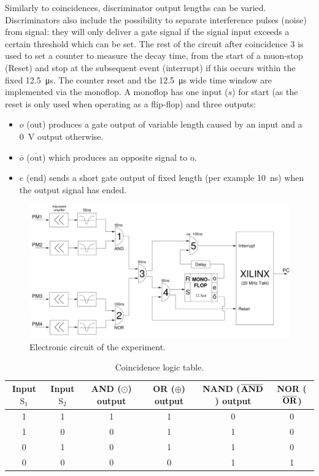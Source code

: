 Similarly to coincidences, discriminator output lengths can be varied. Discriminators also include the possibility to separate interference pulses (noise) from signal: they will only deliver a gate signal if the signal input exceeds a certain threshold which can be set. The rest of the circuit after coincidence 3 is used to set a counter to measure the decay time, from the start of a muon-stop (Reset) and stop at the subsequent event (interrupt) if this occurs within the fixed \SI{12.5}{\micro\second}. The counter reset and the \SI{12.5}{\micro\second} wide time window are implemented via the monoflop. A monoflop has one input ($s$) for start (as the reset is only used when operating as a flip-flop) and three outputs:

\begin{itemize}
\item $o$ (out) produces a gate output of variable length caused by an input and a \SI{0}{\volt} output otherwise.
\item $\overline{o}$ ($\overline{\text{out}}$) which produces an opposite signal to o.
\item $e$ (end) sends a short gate output of fixed length (per example \SI{10}{\nano\second}) when the output signal has ended.
\end{itemize}

\begin{figure}[htbp]
\centering
\includegraphics[width=0.7\linewidth]{./fig/electronicc.png}
\caption{Electronic circuit of the experiment.}
\label{fig:elek}
\end{figure}

\begin{table}
\begin{tabular}{|c|c|c|c|c|c|}
\hline
Input $\text{S}_1$ & Input $\text{S}_2$ & \textbf{AND} ($\odot$) output & \textbf{OR} ($\oplus$) output & \textbf{NAND} ($\overline{\text{\textbf{AND}}}$) output & \textbf{NOR} ($\overline{\text{\textbf{OR}}}$) \\ \hline
1 & 1 & 1 & 1 & 0 & 0 \\
1 & 0 & 0 & 1 & 1 & 0 \\
0 & 1 & 0 & 1 & 1 & 0 \\
0 & 0 & 0 & 0 & 1 & 1 \\ \hline
\end{tabular}
\caption{Coincidence logic table.}
\label{tab:log}
\end{table}


